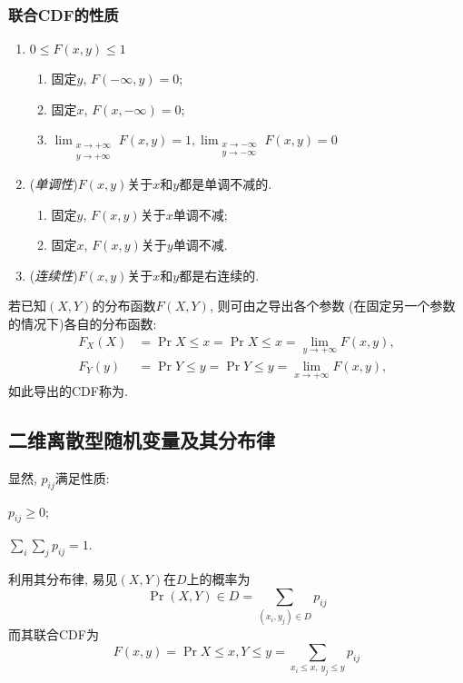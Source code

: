 \subsubsection{联合CDF的性质}
\begin{enumerate}
    \item $0\leq F(x, y )\leq 1$
          \begin{enumerate}
              \item 固定$y$, $F(-\infty, y ) = 0$;
              \item 固定$x$, $F(x, -\infty) = 0$;
              \item $\lim_{\substack{x\to +\infty\\y\to +\infty}}F(x, y ) = 1, \lim_{\substack{x\to -\infty\\y\to -\infty}}F(x, y) = 0$
          \end{enumerate}
    \item (\emph{单调性})$F(x, y )$关于$x$和$y$都是单调不减的.
          \begin{enumerate}
              \item 固定$y$, $F(x, y )$关于$x$单调不减;
              \item 固定$x$, $F(x, y )$关于$y$单调不减.
          \end{enumerate}
    \item (\emph{连续性})$F(x, y )$关于$x$和$y$都是右连续的.
\end{enumerate}
若已知$(X, Y)$的分布函数$F(X, Y)$, 则可由之导出各个参数 (在固定另一个参数的情况下)各自的分布函数:
\begin{align}
    F_X(X) & = \Pr{X\leq x } =\Pr{X\leq x} = \lim_{y\to +\infty}F(x, y), \\
    F_Y(y) & = \Pr{Y\leq y } =\Pr{Y\leq y} = \lim_{x\to +\infty}F(x, y),
\end{align}
如此导出的CDF称为.
\subsection{二维离散型随机变量及其分布律}
显然, $p_{ij}$满足性质:\;\;
\begin{enumerate*}
    \item $p_{ij}\geq 0$;
          \quad\item $\sum_i\sum_j p_{ij} = 1$.
\end{enumerate*}
利用其分布律, 易见$(X, Y )$在$D$上的概率为
\begin{equation}
    \Pr{(X, Y)\in D} = \sum_{(x_i, y_j)\in D}p_{ij}
\end{equation}
而其联合CDF为
\begin{equation}
    F(x, y) = \Pr{X\leq x, Y\leq y } = \sum_{x_i\leq x, \, y_j\leq y}p_{ij}
\end{equation}
